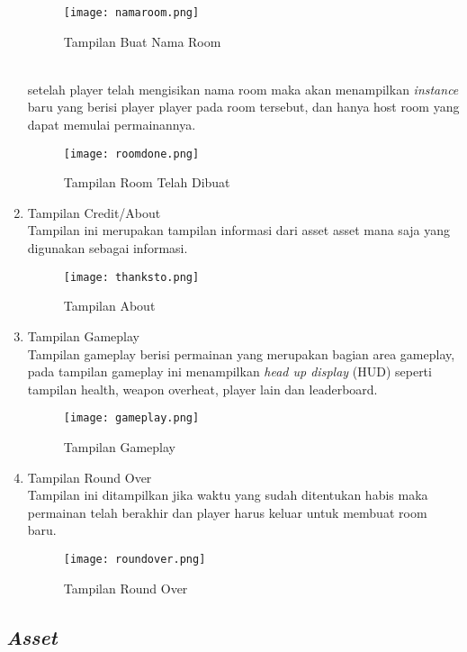 \begin{enumerate}
\begin{figure}[h]
        \centering
        \texttt{[image: namaroom.png]}
        \caption{Tampilan Buat Nama Room}
        \label{fig:namaroom}
    \end{figure}
    \\ setelah player telah mengisikan nama room maka akan menampilkan \textit{instance} baru yang berisi player player pada room tersebut, dan hanya host room yang dapat memulai permainannya.
    \newpage
    \begin{figure}[h]
        \centering
        \texttt{[image: roomdone.png]}
        \caption{Tampilan Room Telah Dibuat}
        \label{fig:roomdone}
    \end{figure}
    \item Tampilan Credit/About \\
    Tampilan ini merupakan tampilan informasi dari asset asset mana saja yang digunakan sebagai informasi.
    \begin{figure}[h]
        \centering
        \texttt{[image: thanksto.png]}
        \caption{Tampilan About}
        \label{fig:thanksto}
    \end{figure}
    \item Tampilan Gameplay \\
    Tampilan gameplay berisi permainan yang merupakan bagian area gameplay, pada tampilan gameplay ini menampilkan \textit{head up display} (HUD) seperti tampilan health, weapon overheat, player lain dan leaderboard.
    \newpage
    \begin{figure}[h]
        \centering
        \texttt{[image: gameplay.png]}
        \caption{Tampilan Gameplay}
        \label{fig:gameplay}
    \end{figure}
    \item Tampilan Round Over \\
    Tampilan ini ditampilkan jika waktu yang sudah ditentukan habis maka permainan telah berakhir dan player harus keluar untuk membuat room baru.
    \begin{figure}[h]
        \centering
        \texttt{[image: roundover.png]}
        \caption{Tampilan Round Over}
        \label{fig:roundover}
    \end{figure}
\end{enumerate}

\subsection{\textit{Asset}}
\noindent

